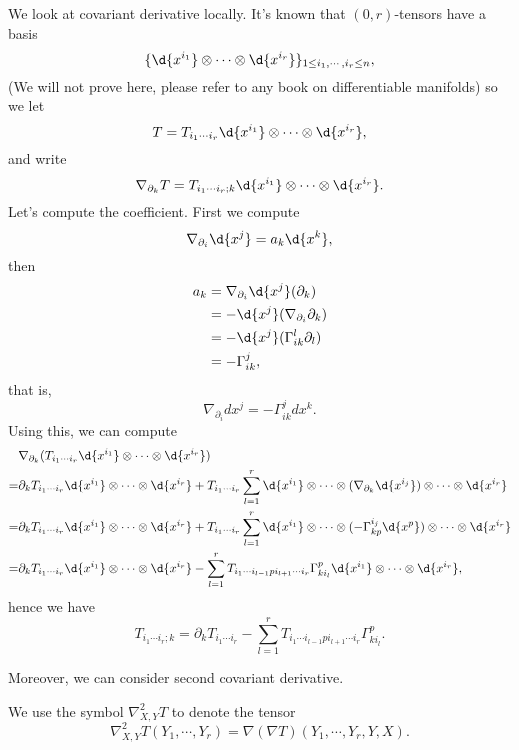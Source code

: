 We look at covariant derivative locally.
It's known that $(0,r)$-tensors have a basis
\[\{\d{x^{i_1}}\otimes\cdots\otimes\d{x^{i_r}}\}_{1\leq i_1,\cdots,i_r\leq n},\]
(We will not prove here, please refer to any book on differentiable manifolds)
so we let
\[T=T_{i_1\cdots i_r}\d{x^{i_1}}\otimes\cdots\otimes\d{x^{i_r}},\]
and write
\[\nabla_{\partial_k}T=T_{i_1\cdots i_r;k}\d{x^{i_1}}\otimes\cdots\otimes\d{x^{i_r}}.\]
Let's compute the coefficient. First we compute
\[\nabla_{\partial_i}\d{x^j}=a_k\d{x^k},\]
then
\begin{align*}
    a_k&=\nabla_{\partial_i}\d{x^j}(\partial_k)\\
    &=-\d{x^j}(\nabla_{\partial_i}\partial_k)\\
    &=-\d{x^j}(\Gamma^l_{ik}\partial_l)\\
    &=-\Gamma^j_{ik},
\end{align*}
that is,
\[\nabla_{\partial_i}d{x^j}=-\Gamma^j_{ik}d{x^k}.\]
Using this, we can compute
\begin{align*}
    &\nabla_{\partial_k}(T_{i_1\cdots i_r}\d{x^{i_1}}\otimes\cdots\otimes\d{x^{i_r}})\\
    =&\partial_kT_{i_1\cdots i_r}\d{x^{i_1}}\otimes\cdots\otimes\d{x^{i_r}}+T_{i_1\cdots i_r}\sum_{l=1}^r\d{x^{i_1}}\otimes\cdots\otimes(\nabla_{\partial_k}\d{x^{i_j}})\otimes\cdots\otimes\d{x^{i_r}}\\
    =&\partial_kT_{i_1\cdots i_r}\d{x^{i_1}}\otimes\cdots\otimes\d{x^{i_r}}+T_{i_1\cdots i_r}\sum_{l=1}^r\d{x^{i_1}}\otimes\cdots\otimes(-\Gamma^{i_j}_{kp}\d{x^p})\otimes\cdots\otimes\d{x^{i_r}}\\
    =&\partial_kT_{i_1\cdots i_r}\d{x^{i_1}}\otimes\cdots\otimes\d{x^{i_r}}-\sum_{l=1}^rT_{i_1\cdots i_{l-1}pi_{l+1}\cdots i_r}\Gamma^p_{ki_l}\d{x^{i_1}}\otimes\cdots\otimes\d{x^{i_r}},
\end{align*}
hence we have
\[T_{i_1\cdots i_r;k}=\partial_kT_{i_1\cdots i_r}-\sum_{l=1}^rT_{i_1\cdots i_{l-1}pi_{l+1}\cdots i_r}\Gamma^p_{ki_l}.\]

Moreover, we can consider second covariant derivative.
\begin{symb}
    We use the symbol $\nabla^2_{X,Y}T$ to denote the tensor 
    \[\nabla^2_{X,Y}T(Y_1,\cdots,Y_r)=\nabla(\nabla T)(Y_1,\cdots,Y_r,Y,X).\]
\end{symb}

